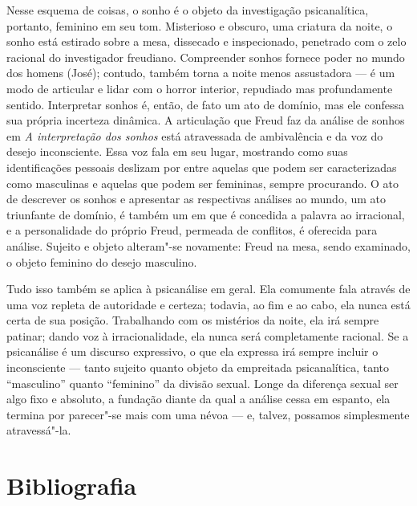 Nesse esquema de coisas, o sonho é o objeto da investigação
psicanalítica, portanto, feminino em seu tom. Misterioso e obscuro, uma
criatura da noite, o sonho está estirado sobre a mesa, dissecado e
inspecionado, penetrado com o zelo racional do investigador freudiano.
Compreender sonhos fornece poder no mundo dos homens (José); contudo,
também torna a noite menos assustadora --- é um modo de articular e lidar
com o horror interior, repudiado mas profundamente sentido. Interpretar
sonhos é, então, de fato um ato de domínio, mas ele confessa sua própria
incerteza dinâmica. A articulação que Freud faz da análise de sonhos em
\emph{A interpretação dos sonhos} está atravessada de ambivalência e da
voz do desejo inconsciente. Essa voz fala em seu lugar, mostrando como
suas identificações pessoais deslizam por entre aquelas que podem ser
caracterizadas como masculinas e aquelas que podem ser femininas, sempre
procurando. O ato de descrever os sonhos e apresentar as respectivas
análises ao mundo, um ato triunfante de domínio, é também um em que é
concedida a palavra ao irracional, e a personalidade do próprio Freud,
permeada de conflitos, é oferecida para análise. Sujeito e objeto
alteram"-se novamente: Freud na mesa, sendo examinado, o objeto feminino
do desejo masculino.

Tudo isso também se aplica à psicanálise em geral. Ela comumente fala
através de uma voz repleta de autoridade e certeza; todavia, ao fim e ao
cabo, ela nunca está certa de sua posição. Trabalhando com os mistérios
da noite, ela irá sempre patinar; dando voz à irracionalidade, ela nunca
será completamente racional. Se a psicanálise é um discurso expressivo,
o que ela expressa irá sempre incluir o inconsciente --- tanto sujeito
quanto objeto da empreitada psicanalítica, tanto ``masculino'' quanto
``feminino'' da divisão sexual. Longe da diferença sexual ser algo fixo
e absoluto, a fundação diante da qual a análise cessa em espanto, ela
termina por parecer"-se mais com uma névoa --- e, talvez, possamos
simplesmente atravessá"-la.

\section{Bibliografia}

